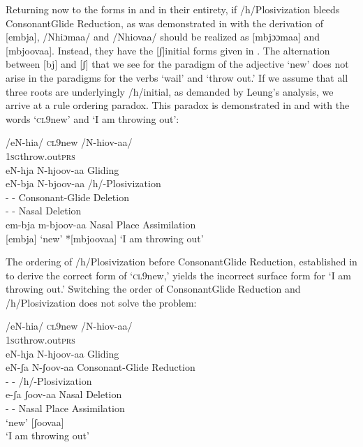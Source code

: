 \documentclass[output=paper]{langsci/langscibook}
\begin{document}
Returning now to the forms in  and  in their entirety, if /h/Plosivization bleeds ConsonantGlide Reduction, as was demonstrated in  with the derivation of [embja], /Nhiɔmaa/ and /Nhiovaa/ should be realized as [mbjɔɔmaa] and [mbjoovaa]. Instead, they have the [ʃ]initial forms given in . The alternation between [bj] and [ʃ] that we see for the paradigm of the adjective ‘new’ does not arise in the paradigms for the verbs ‘wail’ and ‘throw out.’ If we assume that all three roots are underlyingly /h/initial, as demanded by Leung’s analysis, we arrive at a rule ordering paradox. This paradox is demonstrated in  and  with the words ‘\textsc{cl}9new’ and ‘I am throwing out\textsc{’}:




\ea{}
 /eN-hia/  \textsc{cl9}new  /N-hiov-aa/\\
  \textsc{1sg}throw.out\textsc{prs}\\
eN-hja      N-hjoov-aa        Gliding\\
eN-bja      N-bjoov-aa        /h/-Plosivization\\
{}-        {}-          Consonant-Glide Deletion\\
{}-        {}-          Nasal Deletion\\
em-bja      m-bjoov-aa        Nasal Place Assimilation\\{}
[embja]  ‘new’    *[mbjoovaa]  ‘I am throwing out’\\
\z

The ordering of /h/Plosivization before ConsonantGlide Reduction, established in  to derive the correct form of ‘\textsc{cl}9new,’ yields the incorrect surface form for ‘\textsc{I} am throwing out.’ Switching the order of ConsonantGlide Reduction and /h/Plosivization does not solve the problem:


\ea{}
 /eN-hia/  \textsc{cl9}new  /N-hiov-aa/ \\
 \textsc{1sg}throw.out\textsc{prs}\\
eN-hja      N-hjoov-aa        Gliding\\
eN-ʃa        N-ʃoov-aa        Consonant-Glide Reduction\\
{}-        {}-          /h/-Plosivization\\
e-ʃa        ʃoov-aa        Nasal Deletion{\rmfnm}\\
{}-        {}-          Nasal Place Assimilation\\
\*[eʃa]    ‘new’    [ʃoovaa]  \\
\glt ‘I am throwing out’
\z
\end{document}
